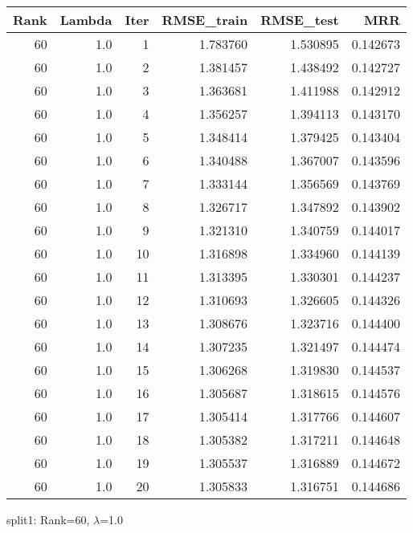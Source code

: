 \begin{tabular}{rrrrrr}
\toprule
 Rank &  Lambda &  Iter &  RMSE\_train &  RMSE\_test &       MRR \\
\midrule
   60 &     1.0 &     1 &    1.783760 &   1.530895 &  0.142673 \\
   60 &     1.0 &     2 &    1.381457 &   1.438492 &  0.142727 \\
   60 &     1.0 &     3 &    1.363681 &   1.411988 &  0.142912 \\
   60 &     1.0 &     4 &    1.356257 &   1.394113 &  0.143170 \\
   60 &     1.0 &     5 &    1.348414 &   1.379425 &  0.143404 \\
   60 &     1.0 &     6 &    1.340488 &   1.367007 &  0.143596 \\
   60 &     1.0 &     7 &    1.333144 &   1.356569 &  0.143769 \\
   60 &     1.0 &     8 &    1.326717 &   1.347892 &  0.143902 \\
   60 &     1.0 &     9 &    1.321310 &   1.340759 &  0.144017 \\
   60 &     1.0 &    10 &    1.316898 &   1.334960 &  0.144139 \\
   60 &     1.0 &    11 &    1.313395 &   1.330301 &  0.144237 \\
   60 &     1.0 &    12 &    1.310693 &   1.326605 &  0.144326 \\
   60 &     1.0 &    13 &    1.308676 &   1.323716 &  0.144400 \\
   60 &     1.0 &    14 &    1.307235 &   1.321497 &  0.144474 \\
   60 &     1.0 &    15 &    1.306268 &   1.319830 &  0.144537 \\
   60 &     1.0 &    16 &    1.305687 &   1.318615 &  0.144576 \\
   60 &     1.0 &    17 &    1.305414 &   1.317766 &  0.144607 \\
   60 &     1.0 &    18 &    1.305382 &   1.317211 &  0.144648 \\
   60 &     1.0 &    19 &    1.305537 &   1.316889 &  0.144672 \\
   60 &     1.0 &    20 &    1.305833 &   1.316751 &  0.144686 \\
\bottomrule
\end{tabular}

\caption{split1: Rank=60, $\lambda$=1.0}
